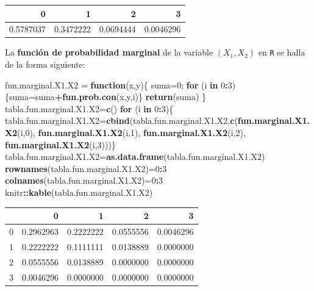 \documentclass[]{book}
\newenvironment{Shaded}{\begin{snugshade}}{\end{snugshade}}
\newcommand{\ControlFlowTok}[1]{\textcolor[rgb]{0.13,0.29,0.53}{\textbf{#1}}}
\newcommand{\DecValTok}[1]{\textcolor[rgb]{0.00,0.00,0.81}{#1}}
\newcommand{\KeywordTok}[1]{\textcolor[rgb]{0.13,0.29,0.53}{\textbf{#1}}}
\newcommand{\NormalTok}[1]{#1}
\newcommand{\OperatorTok}[1]{\textcolor[rgb]{0.81,0.36,0.00}{\textbf{#1}}}
\newcommand{\StringTok}[1]{\textcolor[rgb]{0.31,0.60,0.02}{#1}}
\begin{document}
\begin{tabular}{r|r|r|r}
\hline
0 & 1 & 2 & 3\\
\hline
0.5787037 & 0.3472222 & 0.0694444 & 0.0046296\\
\hline
\end{tabular}

La \textbf{función de probabilidad marginal} de la variable \((X_1,X_2)\) en \texttt{R} se halla de la forma siguiente:

\begin{Shaded}
\begin{Highlighting}[]
\NormalTok{fun.marginal.X1.X2 =}\StringTok{ }\ControlFlowTok{function}\NormalTok{(x,y)\{}
\NormalTok{  suma=}\DecValTok{0}\NormalTok{;}
  \ControlFlowTok{for}\NormalTok{ (i }\ControlFlowTok{in} \DecValTok{0}\OperatorTok{:}\DecValTok{3}\NormalTok{)\{suma=suma}\OperatorTok{+}\KeywordTok{fun.prob.con}\NormalTok{(x,y,i)\}}
  \KeywordTok{return}\NormalTok{(suma)}
\NormalTok{\}}
\NormalTok{tabla.fun.marginal.X1.X2=}\KeywordTok{c}\NormalTok{()}
\ControlFlowTok{for}\NormalTok{ (i }\ControlFlowTok{in} \DecValTok{0}\OperatorTok{:}\DecValTok{3}\NormalTok{)\{}
\NormalTok{  tabla.fun.marginal.X1.X2=}\KeywordTok{cbind}\NormalTok{(tabla.fun.marginal.X1.X2,}\KeywordTok{c}\NormalTok{(}\KeywordTok{fun.marginal.X1.X2}\NormalTok{(i,}\DecValTok{0}\NormalTok{),}
                                                            \KeywordTok{fun.marginal.X1.X2}\NormalTok{(i,}\DecValTok{1}\NormalTok{),}
                                                            \KeywordTok{fun.marginal.X1.X2}\NormalTok{(i,}\DecValTok{2}\NormalTok{),}
                                                            \KeywordTok{fun.marginal.X1.X2}\NormalTok{(i,}\DecValTok{3}\NormalTok{)))\}}
\NormalTok{tabla.fun.marginal.X1.X2=}\KeywordTok{as.data.frame}\NormalTok{(tabla.fun.marginal.X1.X2)}
\KeywordTok{rownames}\NormalTok{(tabla.fun.marginal.X1.X2)=}\DecValTok{0}\OperatorTok{:}\DecValTok{3}
\KeywordTok{colnames}\NormalTok{(tabla.fun.marginal.X1.X2)=}\DecValTok{0}\OperatorTok{:}\DecValTok{3}
\NormalTok{knitr}\OperatorTok{::}\KeywordTok{kable}\NormalTok{(tabla.fun.marginal.X1.X2)}
\end{Highlighting}
\end{Shaded}

\begin{tabular}{l|r|r|r|r}
\hline
  & 0 & 1 & 2 & 3\\
\hline
0 & 0.2962963 & 0.2222222 & 0.0555556 & 0.0046296\\
\hline
1 & 0.2222222 & 0.1111111 & 0.0138889 & 0.0000000\\
\hline
2 & 0.0555556 & 0.0138889 & 0.0000000 & 0.0000000\\
\hline
3 & 0.0046296 & 0.0000000 & 0.0000000 & 0.0000000\\
\hline
\end{tabular}
\end{document}
